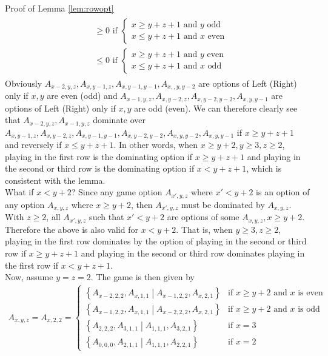 \begin{proof2}{Proof of Lemma \ref{lem:rowopt}}
\begin{align*}
\begin{split}
&\ge0\text{ if }
\left\{
\begin{array}{l}
x\ge y+z+1\text{ and $y$ odd}\\
x\le y+z+1\text{ and $x$ even}
\end{array}\right.\\
&\le0\text{ if }
\left\{
\begin{array}{l}
x\ge y+z+1\text{ and $y$ even}\\
x\le y+z+1\text{ and $x$ odd}
\end{array}\right.
\end{split}
\end{align*}
Obviously $A_{x-2,y,z},A_{x,y-1,z},A_{x,y-1,y-1},A_{x,,y,y-2}$ are options of Left (Right) only if $x,y$ are even (odd) and $A_{x-1,y,z},A_{x,y-2,z},A_{x,y-2,y-2},A_{x,y,y-1}$ are options of Left (Right) only if $x,y$ are odd (even). We can therefore clearly see that $A_{x-2,y,z},A_{x-1,y,z}$ dominate over $A_{x,y-1,z},A_{x,y-2,z},A_{x,y-1,y-1}, A_{x,y-2,y-2},A_{x,y,y-2},A_{x,y,y-1}$ if $x\ge y+z+1$ and reversely if $x\le y+z+1$. In other words, when $x\ge y+2,y\ge3,z\ge2$, playing in the first row is the dominating option if $x\ge y+z+1$ and playing in the second or third row is the dominating option if $x<y+z+1$, which is consistent with the lemma.
\\
What if $x< y+2$? Since any game option $A_{x',y,z}$ where $x'< y+2$ is an option of any option $A_{x,y,z}$ where $x\ge y+2$, then $A_{x',y,z}$ must be dominated by $A_{x,y,z}$. With $z\ge2$, all $A_{x',y,z}$ such that $x'< y+2$ are options of some $A_{x,y,z},x\ge y+2$. Therefore the above is also valid for $x< y+2$. That is, when $y\ge3,z\ge2$, playing in the first row dominates by the option of playing in the second or third row if $x\ge y+z+1$ and playing in the second or third row dominates playing in the first row if $x<y+z+1$.
\\
Now, assume $y=z=2$. The game is then given by 
\begin{align*}
A_{x,y,z}=A_{x,2,2}=\left\{
\begin{array}{ll}
\left\{A_{x-2,2,2},A_{x,1,1}\middle|A_{x-1,2,2},A_{x,2,1}\right\}&\text{if $x\ge y+2$ and $x$ is even}\\
\left\{A_{x-1,2,2},A_{x,1,1}\middle|A_{x-2,2,2},A_{x,2,1}\right\}&\text{if $x\ge y+2$ and $x$ is odd}\\
\left\{A_{2,2,2},A_{3,1,1}\middle|A_{1,1,1},A_{3,2,1}\right\}&\text{if $x=3$}\\
\left\{A_{0,0,0},A_{2,1,1}\middle|A_{1,1,1},A_{2,2,1}\right\}&\text{if $x=2$}
\end{array}\right.

\end{align*}
\end{proof2}
